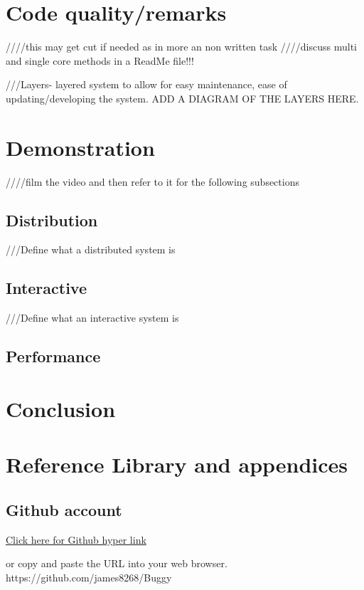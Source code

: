 \documentclass[8pt, a4paper]{article}
\begin{document}
\section{Code quality/remarks} ////this may get cut if needed as in more an non written task
////discuss multi and single core methods in a ReadMe file!!!


///Layers- layered system to allow for easy maintenance, ease of updating/developing the system. ADD A DIAGRAM OF THE LAYERS HERE. 


\section{Demonstration}
////film the video and then refer to it for the following subsections


\subsection{Distribution}
///Define what a distributed system is 

\subsection{Interactive}
///Define what an interactive system is

\subsection{Performance}






\section{Conclusion}


\section{Reference Library and appendices}
\subsection{Github account}

\href{https://github.com/james8268/Buggy}{Click here for Github hyper link} 

or copy and paste the URL into your web browser. https://github.com/james8268/Buggy

\listoffigures
\end{document}
